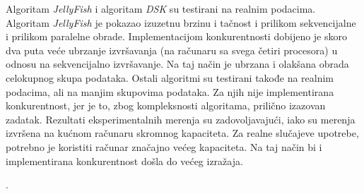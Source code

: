 \documentclass[12pt,oneside]{memoir}
\begin{document}
Algoritam \textit{JellyFish} i algoritam \textit{DSK} su testirani na realnim podacima. Algoritam \textit{JellyFish} je pokazao izuzetnu brzinu i tačnost i prilikom sekvencijalne i prilikom paralelne obrade. Implementacijom konkurentnosti dobijeno je skoro dva puta veće ubrzanje izvršavanja (na računaru sa svega četiri procesora) u odnosu na sekvencijalno izvršavanje. Na taj način je ubrzana i olakšana obrada celokupnog skupa podataka. Ostali algoritmi su testirani takođe na realnim podacima, ali na manjim skupovima podataka. Za njih nije implementirana konkurentnost, jer je to, zbog kompleksnosti algoritama, prilično izazovan zadatak. Rezultati eksperimentalnih merenja su zadovoljavajući, iako su merenja izvršena na kućnom računaru skromnog kapaciteta. Za realne slučajeve upotrebe, potrebno je koristiti računar značajno većeg kapaciteta. Na taj način bi i implementirana konkurentnost došla do većeg izražaja.


.%

\literatura

\backmatter

\end{document}
